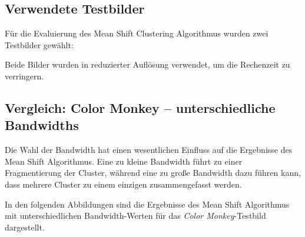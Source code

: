 \subsection*{Verwendete Testbilder}

Für die Evaluierung des Mean Shift Clustering Algorithmus wurden zwei Testbilder gewählt:

\begin{minipage}[t]{0.5\textwidth}
\end{minipage}
%
\begin{minipage}[t]{0.5\textwidth}
\end{minipage}

Beide Bilder wurden in reduzierter Auflösung verwendet, um die Rechenzeit zu verringern.

\subsection*{Vergleich: Color Monkey – unterschiedliche Bandwidths}

Die Wahl der Bandwidth hat einen wesentlichen Einfluss auf die Ergebnisse des Mean Shift Algorithmus. Eine zu kleine Bandwidth führt zu einer Fragmentierung der Cluster, während eine zu große Bandwidth dazu führen kann, dass mehrere Cluster zu einem einzigen zusammengefasst werden.

In den folgenden Abbildungen sind die Ergebnisse des Mean Shift Algorithmus mit unterschiedlichen Bandwidth-Werten für das \textit{Color Monkey}-Testbild dargestellt.

\begin{minipage}[t]{0.23\textwidth}
\end{minipage}
%
\begin{minipage}[t]{0.23\textwidth}
\end{minipage}
%
\begin{minipage}[t]{0.23\textwidth}
\end{minipage}
%
\begin{minipage}[t]{0.23\textwidth}
\end{minipage}

